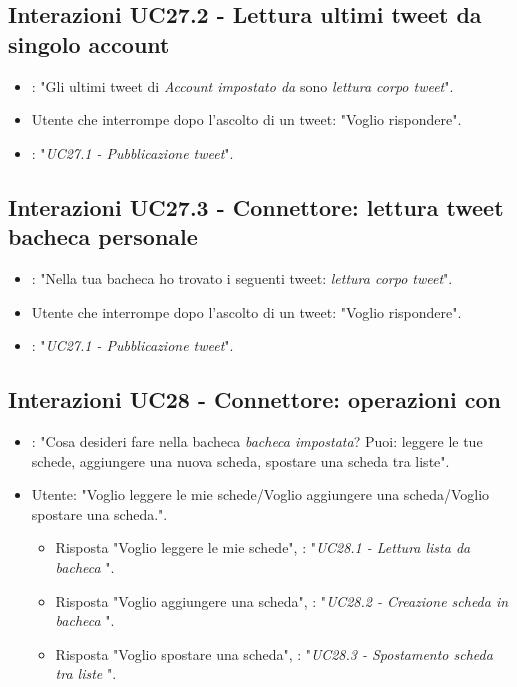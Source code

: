 \subsection{Interazioni UC27.2 - Lettura ultimi tweet da singolo account}
\label{sec:connettore_twitter_profilo}
 \begin{itemize}
        \item {}: "Gli ultimi tweet di {\it Account impostato da } sono {\it lettura corpo tweet}".
        \item Utente che interrompe dopo l'ascolto di un tweet: "Voglio rispondere".
        \item {}: "{\it UC27.1 - Pubblicazione tweet}".
    \end{itemize}


\subsection{Interazioni UC27.3 - Connettore: lettura tweet bacheca personale}
\label{sec:connettore_twitter_bacheca}
 \begin{itemize}
        \item {}: "Nella tua bacheca ho trovato i seguenti tweet: {\it lettura corpo tweet}".
        \item Utente che interrompe dopo l'ascolto di un tweet: "Voglio rispondere".
        \item {}: "{\it UC27.1 - Pubblicazione tweet}".
    \end{itemize}


\subsection{Interazioni  UC28 - Connettore: operazioni con }
\label{sec:connettore_trello} 
 \begin{itemize}
        \item {}: "Cosa desideri fare nella bacheca {\it bacheca impostata}? Puoi: leggere le tue schede, aggiungere una nuova scheda, spostare una scheda tra liste".
        \item Utente: "Voglio leggere le mie schede/Voglio aggiungere una scheda/Voglio spostare una scheda.".
        \begin{itemize}
         \item{Risposta "Voglio leggere le mie schede"}, : "{\it UC28.1 - Lettura lista da bacheca }".
         \item{Risposta "Voglio aggiungere una scheda"}, : "{\it  UC28.2 - Creazione scheda in bacheca }".
         \item{Risposta "Voglio spostare una scheda"}, : "{\it UC28.3 - Spostamento scheda tra liste }".
         \end{itemize}
    \end{itemize}


